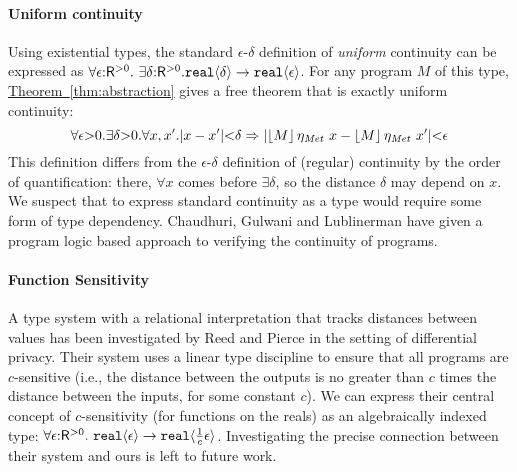 \documentclass{sigplanconf}
\newcommand{\abs}[1]{\lvert #1 \rvert}
\newcommand{\tyPrim}[2]{\textup{\texttt{#1}}\langle #2 \rangle}
\newcommand{\tmSem}[1]{\left\lfloor{#1}\right\rfloor}
\newcommand{\thmref}[1]{\hyperref[#1]{Theorem~\ref*{#1}}}
\theoremstyle{examplestyle}
\theoremstyle{restatementstyle}
\begin{document}
\paragraph{Uniform continuity}
Using %
existential types, %
the standard $\epsilon$-$\delta$ definition of
\emph{uniform} continuity can be expressed as %
$  \forall \epsilon \mathord: \metricSort.\ \exists \delta\mathord: \metricSort.\\ \tyPrim{real}{\delta} \to \tyPrim{real}{\epsilon}$.
For any program $M$ of this type, %
\thmref{thm:abstraction} gives a free theorem that is exactly 
uniform continuity:
\begin{displaymath}
  \forall \epsilon \mathord> 0. \exists \delta \mathord> 0. \forall x,x'. \abs{x - x'} \mathord< \delta \Rightarrow \abs{\tmSem{M}\eta_\Metric~x - \tmSem{M}\eta_\Metric~x'} \mathord< \epsilon
\end{displaymath}
This definition differs from the $\epsilon$-$\delta$ definition of
(regular) continuity by the order of quantification:
there, $\forall x$ comes before $\exists \delta$, so the distance
$\delta$ may depend on %
$x$. We suspect that to express standard continuity as a type would
require some form of type dependency. Chaudhuri, Gulwani and
Lublinerman \cite{chaudhuri10continuity} have given a program logic
based approach to verifying the continuity of programs.

\paragraph{Function Sensitivity}
A type system with a relational interpretation that tracks distances
between values has %
been investigated by Reed and Pierce \cite{reed10distance} in the
setting of differential privacy. Their system uses a linear type
discipline to ensure that all programs are $c$-sensitive (i.e., the
distance between the outputs is no greater than $c$ times the
distance between the inputs, for some constant $c$). We can express
their central concept of $c$-sensitivity (for functions on the reals)
as an algebraically indexed type: $\forall
\epsilon\mathord:\metricSort.\ \tyPrim{real}{\epsilon} \to
\tyPrim{real}{\frac{1}{c}\epsilon}$. Investigating the precise
connection between their system and ours is left to future work.
\end{document}
